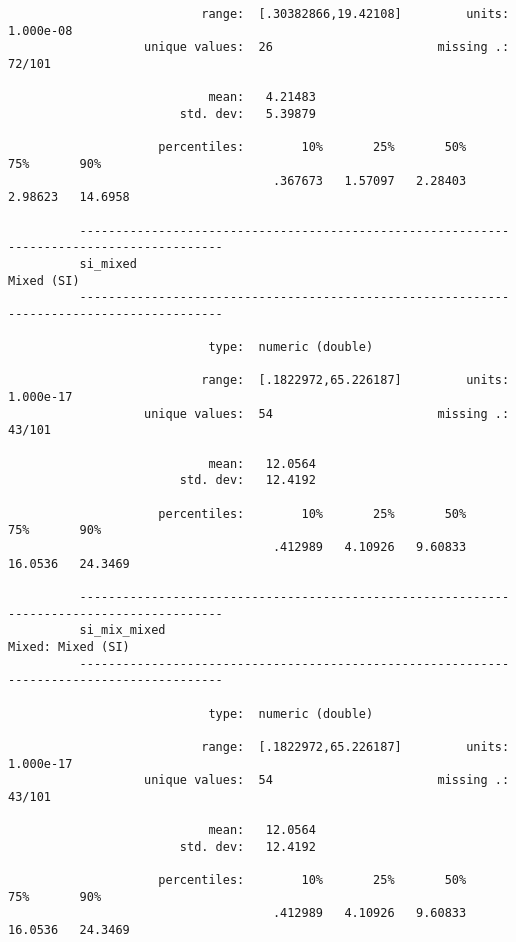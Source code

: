 \documentclass{article}
\begin{document}
\begin{verbatim}
                           range:  [.30382866,19.42108]         units:  1.000e-08
                   unique values:  26                       missing .:  72/101
          
                            mean:   4.21483
                        std. dev:   5.39879
          
                     percentiles:        10%       25%       50%       75%       90%
                                     .367673   1.57097   2.28403   2.98623   14.6958
          
          ------------------------------------------------------------------------------------------
          si_mixed                                                                        Mixed (SI)
          ------------------------------------------------------------------------------------------
          
                            type:  numeric (double)
          
                           range:  [.1822972,65.226187]         units:  1.000e-17
                   unique values:  54                       missing .:  43/101
          
                            mean:   12.0564
                        std. dev:   12.4192
          
                     percentiles:        10%       25%       50%       75%       90%
                                     .412989   4.10926   9.60833   16.0536   24.3469
          
          ------------------------------------------------------------------------------------------
          si_mix_mixed                                                             Mixed: Mixed (SI)
          ------------------------------------------------------------------------------------------
          
                            type:  numeric (double)
          
                           range:  [.1822972,65.226187]         units:  1.000e-17
                   unique values:  54                       missing .:  43/101
          
                            mean:   12.0564
                        std. dev:   12.4192
          
                     percentiles:        10%       25%       50%       75%       90%
                                     .412989   4.10926   9.60833   16.0536   24.3469
          

\end{verbatim}
\end{document}
